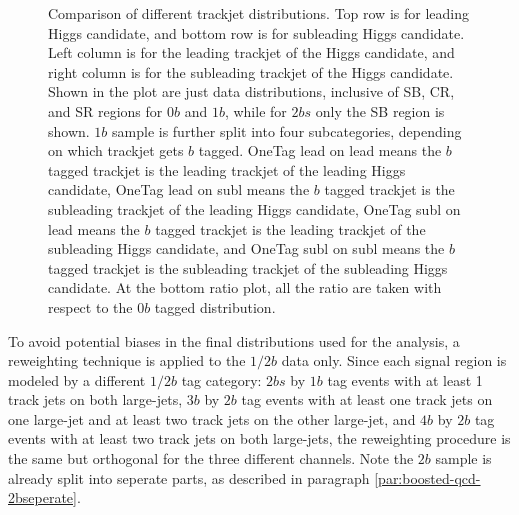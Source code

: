 \begin{figure}[htbp!]
\begin{center}
\caption{Comparison of different trackjet \pt distributions. Top row is for leading \pt Higgs candidate, and bottom row is for subleading \pt Higgs candidate. Left column is for the leading \pt trackjet of the Higgs candidate, and right column is for the subleading \pt trackjet of the Higgs candidate. Shown in the plot are just data distributions, inclusive of SB, CR, and SR regions for $0b$ and $1b$, while for $2bs$ only the SB region is shown. $1b$ sample is further split into four subcategories, depending on which trackjet gets $b$ tagged. OneTag lead on lead means the $b$ tagged trackjet is the leading trackjet of the leading Higgs candidate, OneTag lead on subl means the $b$ tagged trackjet is the subleading trackjet of the leading Higgs candidate, OneTag subl on lead means the $b$ tagged trackjet is the leading trackjet of the subleading Higgs candidate, and OneTag subl on subl means the $b$ tagged trackjet is the subleading trackjet of the subleading Higgs candidate. At the bottom ratio plot, all the ratio are taken with respect to the $0b$ tagged distribution.}
\label{fig:rw-2bs-comp}
\end{center}
\end{figure}

To avoid potential biases in the final distributions used for the analysis, a reweighting technique is applied to the $1/2b$ data only. Since each signal region is modeled by a different $1/2b$ tag category: $2bs$ by $1b$ tag events with at least 1 track jets on both large-\R jets, $3b$ by $2b$ tag events with at least one track jets on one large-\R jet and at least two track jets on the other large-\R jet, and $4b$ by $2b$ tag events with at least two track jets on both large-\R jets, the reweighting procedure is the same but orthogonal for the three different channels. Note the $2b$ sample is already split into seperate parts, as described in paragraph \ref{par:boosted-qcd-2bseperate}.

